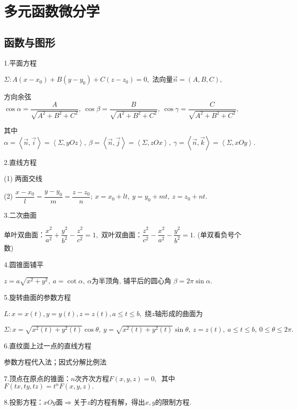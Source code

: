 \documentclass[UTF8]{ctexart}
\numberwithin{equation}{section}
\numberwithin{figure}{section}
\numberwithin{table}{section}
\newcommand\no{\noindent}
\newcommand\dis{\displaystyle}
\newcommand\ls{\leqslant}
\begin{document}
\begin{spacing}{2}
\begin{enumerate}[itemindent=1.4em, label=(\arabic*)]
\end{enumerate}

\newpage

\section{多元函数微分学}

\subsection{函数与图形}

\no1.平面方程

$\dis\Sigma:A(x-x_0)+B(y-y_0)+C(z-z_0)=0,$ 法向量$\stackrel{\rightarrow}{n}=
(A,B,C),$

方向余弦$\dis\cos\alpha=\dfrac{A}{\sqrt{A^2+B^2+C^2}},\ 
\cos\beta=\dfrac{B}{\sqrt{A^2+B^2+C^2}},\ 
\cos\gamma=\dfrac{C}{\sqrt{A^2+B^2+C^2}},$ 

其中$\alpha=\left<\stackrel{\rightarrow}{n},\stackrel{\rightarrow}{i}\right>
=\left<\Sigma,yOz\right>,\ 
\beta=\left<\stackrel{\rightarrow}{n},\stackrel{\rightarrow}{j}\right>
=\left<\Sigma,zOx\right>,\ 
\gamma=\left<\stackrel{\rightarrow}{n},\stackrel{\rightarrow}{k}\right>
=\left<\Sigma,xOy\right>.$

\no2.直线方程

(1) 两面交线

(2) $\dfrac{x-x_0}{l}=\dfrac{y-y_0}{m}=\dfrac{z-z_0}{n};\ x=x_0+lt,\ 
y=y_0+mt,\ z=z_0+nt.$

\no3.二次曲面

单叶双曲面：$\dfrac{x^2}{a^2}+\dfrac{y^2}{b^2}-\dfrac{z^2}{c^2}=1,$
 双叶双曲面：$\dfrac{z^2}{c^2}-\dfrac{x^2}{a^2}-\dfrac{y^2}{b^2}=1.$
(单双看负号个数)

\no4.圆锥面铺平

$\dis z=a\sqrt{x^2+y^2},\ a=\cot \alpha,\ \alpha$为半顶角, 铺平后的圆心角
$\beta=2\pi\sin\alpha.$

\no5.旋转曲面的参数方程

$L:x=x(t),y=y(t),z=z(t),a\ls t\ls b,$ 绕$z$轴形成的曲面为

$\dis\Sigma: x=\sqrt{x^2(t)+y^2(t)}\cos\theta,\ 
y=\sqrt{x^2(t)+y^2(t)}\sin\theta,\ z=z(t),\ a\ls t\ls b,\ 0\ls\theta\ls 2\pi.$

\no6.直纹面上过一点的直线方程

参数方程代入法；因式分解比例法

\no7.顶点在原点的锥面：$n$次齐次方程$F(x,y,z)=0,\ $
其中$F(tx,ty,tz)=t^nF(x,y,z).$

\no8.投影方程：$xOy$面$\Longrightarrow$关于$z$的方程有解，得出$x,y$的限制方程.


\end{spacing}
\end{document}
